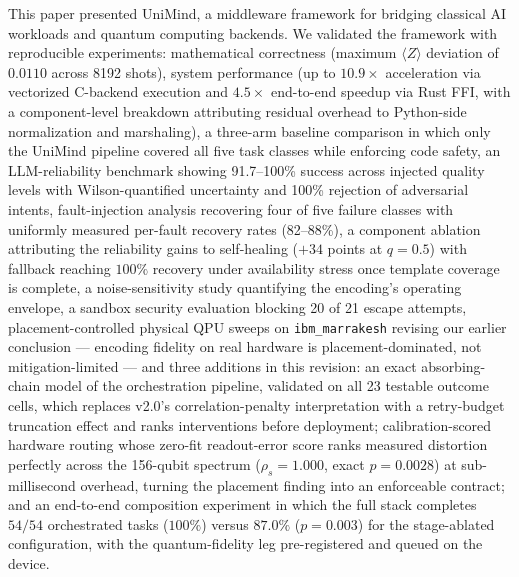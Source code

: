 ﻿\documentclass[12pt,a4paper]{article}
\begin{document}
This paper presented UniMind, a middleware framework for bridging classical AI workloads and quantum computing backends. We validated the framework with reproducible experiments: mathematical correctness (maximum $\langle Z \rangle$ deviation of $0.0110$ across 8192 shots), system performance (up to $10.9\times$ acceleration via vectorized C-backend execution and $4.5\times$ end-to-end speedup via Rust FFI, with a component-level breakdown attributing residual overhead to Python-side normalization and marshaling), a three-arm baseline comparison in which only the UniMind pipeline covered all five task classes while enforcing code safety, an LLM-reliability benchmark showing 91.7--100\% success across injected quality levels with Wilson-quantified uncertainty and 100\% rejection of adversarial intents, fault-injection analysis recovering four of five failure classes with uniformly measured per-fault recovery rates (82--88\%), a component ablation attributing the reliability gains to self-healing ($+34$ points at $q{=}0.5$) with fallback reaching $100\%$ recovery under availability stress once template coverage is complete, a noise-sensitivity study quantifying the encoding's operating envelope, a sandbox security evaluation blocking 20 of 21 escape attempts, placement-controlled physical QPU sweeps on \texttt{ibm\_marrakesh} revising our earlier conclusion --- encoding fidelity on real hardware is placement-dominated, not mitigation-limited --- and three additions in this revision: an exact absorbing-chain model of the orchestration pipeline, validated on all 23 testable outcome cells, which replaces v2.0's correlation-penalty interpretation with a retry-budget truncation effect and ranks interventions before deployment; calibration-scored hardware routing whose zero-fit readout-error score ranks measured distortion perfectly across the 156-qubit spectrum ($\rho_s = 1.000$, exact $p = 0.0028$) at sub-millisecond overhead, turning the placement finding into an enforceable contract; and an end-to-end composition experiment in which the full stack completes $54/54$ orchestrated tasks ($100\%$) versus $87.0\%$ ($p = 0.003$) for the stage-ablated configuration, with the quantum-fidelity leg pre-registered and queued on the device.
\end{document}
